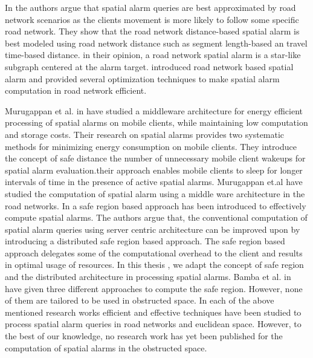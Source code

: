 \label{sec:roadalarm}
In \cite{roadalarm} the authors argue that spatial alarm queries are best approximated by road network scenarios as the clients movement is more likely to follow some specific road network. They show that the road network distance-based spatial alarm is best modeled using road network distance such as segment length-based an travel time-based distance. in their opinion, a road network spatial alarm is a star-like subgraph centered at the alarm target. \cite{roadalarm} introduced road network based spatial alarm and provided several optimization techniques to make spatial alarm computation in road network efficient.
\vspace{10pt}

Murugappan et al. in \cite{mur} have studied a middleware architecture for energy efficient processing of spatial alarms on mobile clients, while maintaining low computation and storage costs. Their research on  spatial alarms provides two systematic methods for minimizing energy consumption on mobile clients. They introduce  the concept of safe distance the number of unnecessary mobile client wakeups for spatial alarm
evaluation.their approach enables mobile clients to sleep for longer intervals of time in the presence of active spatial alarms. Murugappan et.al have studied the computation of spatial alarm using a middle ware architecture in the road networks. 
\vspace{10pt}
In \cite{bamba} a safe region based approach has been introduced to effectively compute spatial alarms. The authors argue that, the conventional computation of spatial alarm queries using server centric architecture can be improved upon by introducing a distributed safe region based approach. The safe region based approach delegates some of the computational overhead to the client and results in optimal usage of resources. In this thesis , we adapt the concept of safe region and the distributed architecture in processing spatial alarms. Bamba et al. in \cite{bamba} have given three different approaches to compute the safe region. However, none of them are tailored to be used in obstructed space. 
 \vspace{10pt}
In each of the above mentioned research works efficient and effective techniques have been studied to process spatial alarm queries in road networks and euclidean space. However, to the best of our knowledge, no research work has yet been published for the computation of spatial alarms in the obstructed space. 

\vspace{10pt}


